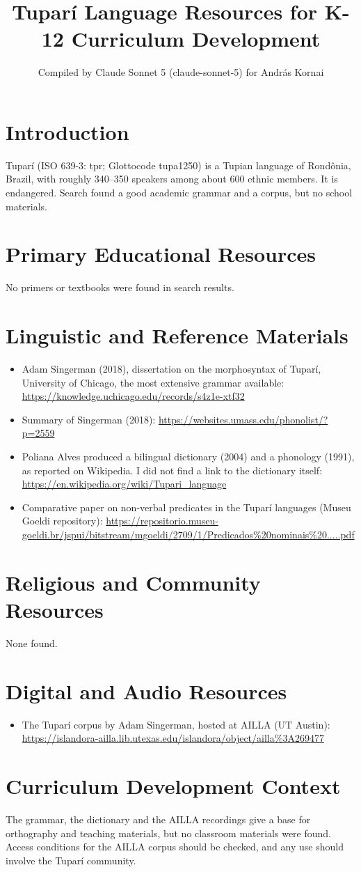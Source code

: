 \documentclass[12pt]{article}
\title{Tupar\'i Language Resources for K-12 Curriculum Development}
\author{Compiled by Claude Sonnet 5 (claude-sonnet-5) for Andr\'as Kornai}
\date{}
\begin{document}
\maketitle

\section{Introduction}
Tupar\'i (ISO 639-3: tpr; Glottocode tupa1250) is a Tupian language of Rond\^onia, Brazil, with roughly 340--350 speakers among about 600 ethnic members. It is endangered. Search found a good academic grammar and a corpus, but no school materials.

\section{Primary Educational Resources}
No primers or textbooks were found in search results.

\section{Linguistic and Reference Materials}
\begin{itemize}
\item Adam Singerman (2018), dissertation on the morphosyntax of Tupar\'i, University of Chicago, the most extensive grammar available: \url{https://knowledge.uchicago.edu/records/s4z1e-xtf32}
\item Summary of Singerman (2018): \url{https://websites.umass.edu/phonolist/?p=2559}
\item Poliana Alves produced a bilingual dictionary (2004) and a phonology (1991), as reported on Wikipedia. I did not find a link to the dictionary itself: \url{https://en.wikipedia.org/wiki/Tupari_language}
\item Comparative paper on non-verbal predicates in the Tupar\'i languages (Museu Goeldi repository): \url{https://repositorio.museu-goeldi.br/jspui/bitstream/mgoeldi/2709/1/Predicados%20nominais%20.....pdf}
\end{itemize}

\section{Religious and Community Resources}
None found.

\section{Digital and Audio Resources}
\begin{itemize}
\item The Tupar\'i corpus by Adam Singerman, hosted at AILLA (UT Austin): \url{https://islandora-ailla.lib.utexas.edu/islandora/object/ailla%3A269477}
\end{itemize}

\section{Curriculum Development Context}
The grammar, the dictionary and the AILLA recordings give a base for orthography and teaching materials, but no classroom materials were found. Access conditions for the AILLA corpus should be checked, and any use should involve the Tupar\'i community.
\end{document}
